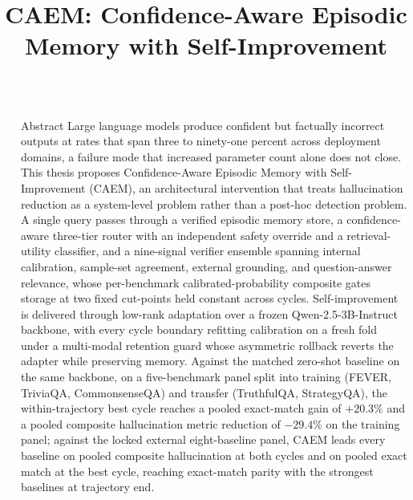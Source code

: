 \documentclass[final]{beamer}
\title{CAEM: Confidence-Aware Episodic Memory with Self-Improvement}
\newlength{\sepwidth}
\newlength{\colwidth}
\newcommand{\separatorcolumn}{\begin{column}{\sepwidth}\end{column}}
\begin{document}
\begin{frame}[t]
\begin{columns}[t]
\separatorcolumn


\begin{column}{\colwidth}

  \begin{block}{Abstract}
    Large language models produce confident but factually incorrect outputs
    at rates that span three to ninety-one percent across deployment
    domains, a failure mode that increased parameter count alone does not
    close. This thesis proposes Confidence-Aware Episodic Memory with
    Self-Improvement (CAEM), an architectural intervention that treats
    hallucination reduction as a system-level problem rather than a
    post-hoc detection problem. A single query passes through a verified
    episodic memory store, a confidence-aware three-tier router with an
    independent safety override and a retrieval-utility classifier, and a
    nine-signal verifier ensemble spanning internal calibration,
    sample-set agreement, external grounding, and question-answer
    relevance, whose per-benchmark calibrated-probability composite gates
    storage at two fixed cut-points held constant across cycles.
    Self-improvement is delivered through low-rank adaptation over a
    frozen Qwen-2.5-3B-Instruct backbone, with every cycle boundary
    refitting calibration on a fresh fold under a multi-modal retention
    guard whose asymmetric rollback reverts the adapter while preserving
    memory. Against the matched zero-shot
    baseline on the same backbone, on a five-benchmark panel split into
    training (FEVER, TriviaQA, CommonsenseQA) and transfer (TruthfulQA,
    StrategyQA), the within-trajectory best cycle reaches a pooled
    exact-match gain of $+20.3\%$ and a pooled composite hallucination
    metric reduction of $-29.4\%$ on the training panel; against the
    locked external eight-baseline panel, CAEM leads every baseline on
    pooled composite hallucination at both cycles and on pooled exact
    match at the best cycle, reaching exact-match parity with the
    strongest baselines at trajectory end.
  \end{block}


\end{column}
\end{columns}
\end{frame}
\end{document}

